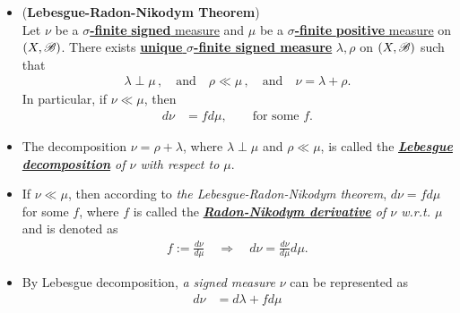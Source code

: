 \documentclass[11pt]{article}
\begin{document}
\begin{itemize}
\item \begin{theorem}(\textbf{Lebesgue-Radon-Nikodym Theorem})\citep{folland2013real}\\
Let $\nu$ be a \underline{\textbf{$\sigma$-finite} \textbf{signed} measure} and $\mu$ be a \underline{\textbf{$\sigma$-finite} \textbf{positive} measure} on $(X,{\mathscr B})$. There exists \underline{\textbf{unique} \textbf{$\sigma$-finite signed measure}} $\lambda, \rho$ on $(X,{\mathscr B})$ such that 
\begin{align*}
\lambda \perp \mu\,, \quad \text{and} \quad \rho \ll \mu\,, \quad \text{and} \quad  \nu= \lambda+ \rho.
\end{align*} 
In particular, if $\nu \ll \mu$, then 
\begin{align*}
d\nu &= f d\mu, \qquad \text{for some }f.
\end{align*} 
\end{theorem}

\item
\begin{definition}
 The decomposition $\nu= \rho + \lambda$, where $\lambda \perp \mu$ and $\rho\ll \mu$, is called the \emph{\textbf{\underline{Lebesgue} \underline{decomposition}} of $\nu$ with respect to $\mu$}.
 \end{definition}

\item \begin{definition}
If $\nu \ll \mu$, then according to \emph{the Lebesgue-Radon-Nikodym theorem}, $d\nu = f d\mu$ for some $f$, where $f$ is called the \emph{\underline{\textbf{Radon-Nikodym derivative}} of $\nu$ w.r.t. $\mu$} and is denoted as
\begin{align*}
f := \frac{d\nu}{ d\mu} \quad \Rightarrow \quad d\nu =  \frac{d\nu}{ d\mu} d\mu.
\end{align*}
 \end{definition}
 
 \item \begin{remark} By Lebesgue decomposition, \emph{a signed measure} $\nu$ can be represented as
 \begin{align*}
 d\nu &= d\lambda + fd\mu 
 \end{align*}
 \end{remark}
 

\end{itemize}
\end{document}
